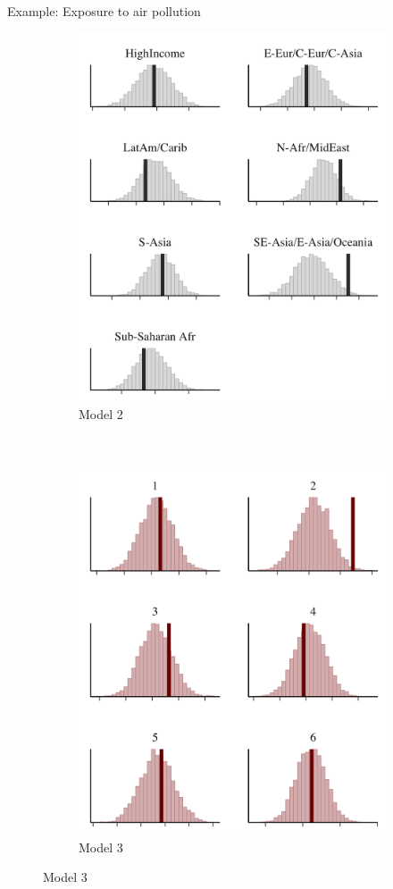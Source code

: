 \documentclass[t]{beamer}
\begin{document}
\begin{frame}{Example: Exposure to air pollution}
\begin{figure}
\begin{subfigure}{.31\textwidth}
\includegraphics[width=\textwidth]{ppc_med_grouped2.png}
\caption{Model 2}
\end{subfigure}
~
\begin{subfigure}{.31\textwidth}
\includegraphics[width=\textwidth]{ppc_med_grouped3.png}
\caption{Model 3}
\end{subfigure}


\end{figure}
\end{frame}
\end{document}
